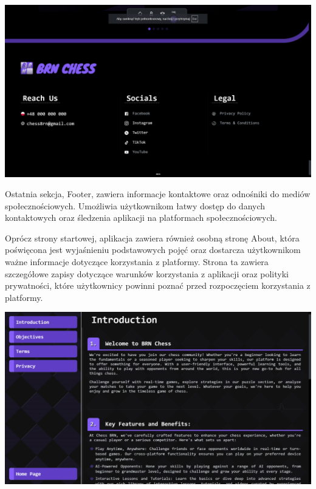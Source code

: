 \documentclass[12pt,a4paper]{article}
\begin{document}
\vspace{1cm}

\begin{minipage}[t]{0.3\textwidth} 
    \vspace{0pt} 
    \centering 
    \includegraphics[width=\linewidth]{images/ins_footer.png} 
\end{minipage} 
\hfill 
\begin{minipage}[t]{0.6\textwidth} 
    \vspace{0pt} 
    \justifying 
    \noindent 
    Ostatnia sekcja, Footer, zawiera informacje kontaktowe oraz odnośniki do mediów społecznościowych. Umożliwia użytkownikom łatwy dostęp do danych kontaktowych oraz śledzenia aplikacji na platformach społecznościowych.
\end{minipage}

\vspace{1cm}

\begin{minipage}[t]{0.6\textwidth} 
    \vspace{0pt} 
    \justifying 
    \noindent 
    Oprócz strony startowej, aplikacja zawiera również osobną stronę About, która poświęcona jest wyjaśnieniu podstawowych pojęć oraz dostarcza użytkownikom ważne informacje dotyczące korzystania z platformy. Strona ta zawiera szczegółowe zapisy dotyczące warunków korzystania z aplikacji oraz polityki prywatności, które użytkownicy powinni poznać przed rozpoczęciem korzystania z platformy.
\end{minipage}
\hfill 
\begin{minipage}[t]{0.3\textwidth} 
    \vspace{0pt} 
    \centering 
    \includegraphics[width=\linewidth]{images/ins_about.png} 
\end{minipage} 
\end{document}
